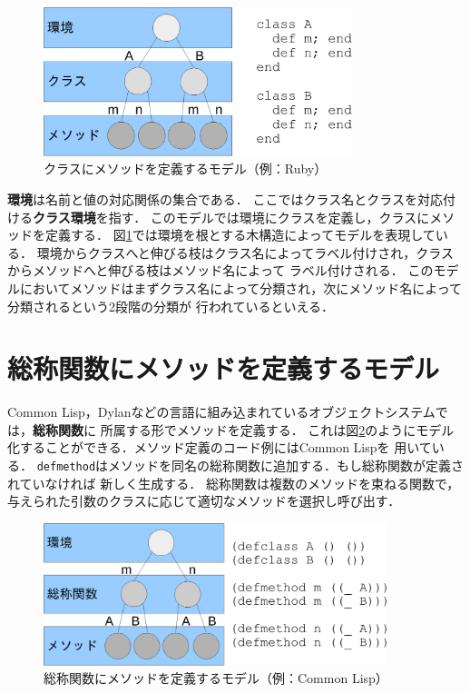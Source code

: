 \documentclass[a4paper,11pt,dvipdfmx]{jreport}
\begin{document}
\begin{figure}[htbp]
	\centering
	\includegraphics[width=9cm]{fig/trees_class-crop.pdf}
	\caption{クラスにメソッドを定義するモデル（例：Ruby）}
	\label{figure:class-model}
\end{figure}

\textbf{環境}は名前と値の対応関係の集合である．
ここではクラス名とクラスを対応付ける\textbf{クラス環境}を指す．
このモデルでは環境にクラスを定義し，クラスにメソッドを定義する．
図\ref{figure:class-model}では環境を根とする木構造によってモデルを表現している．
環境からクラスへと伸びる枝はクラス名によってラベル付けされ，クラスからメソッドへと伸びる枝はメソッド名によって
ラベル付けされる．
このモデルにおいてメソッドはまずクラス名によって分類され，次にメソッド名によって分類されるという2段階の分類が
行われているといえる．

\section{総称関数にメソッドを定義するモデル}

Common Lisp，Dylanなどの言語に組み込まれているオブジェクトシステムでは，\textbf{総称関数}に
所属する形でメソッドを定義する．
これは図\ref{figure:gf-model}のようにモデル化することができる．メソッド定義のコード例にはCommon Lispを
用いている．
\verb|defmethod|はメソッドを同名の総称関数に追加する．もし総称関数が定義されていなければ
新しく生成する．
総称関数は複数のメソッドを束ねる関数で，与えられた引数のクラスに応じて適切なメソッドを選択し呼び出す．

\begin{figure}[htbp]
	\centering
	\includegraphics[width=10cm]{fig/trees_gf-crop.pdf}
	\caption{総称関数にメソッドを定義するモデル（例：Common Lisp）}
	\label{figure:gf-model}
\end{figure}
\end{document}
